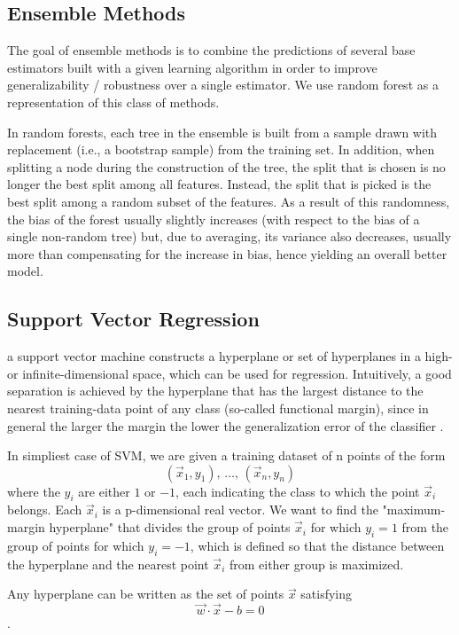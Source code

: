 \subsection{Ensemble Methods}

The goal of ensemble methods is to combine the predictions of several base estimators built with a given learning algorithm in order to improve generalizability / robustness over a single estimator. We use random forest as a representation of this class of methods.

In random forests, each tree in the ensemble is built from a sample drawn with replacement (i.e., a bootstrap sample) from the training set. In addition, when splitting a node during the construction of the tree, the split that is chosen is no longer the best split among all features. Instead, the split that is picked is the best split among a random subset of the features. As a result of this randomness, the bias of the forest usually slightly increases (with respect to the bias of a single non-random tree) but, due to averaging, its variance also decreases, usually more than compensating for the increase in bias, hence yielding an overall better model. \cite{breiman2001random}

\subsection{Support Vector Regression}

a support vector machine constructs a hyperplane or set of hyperplanes in a high- or infinite-dimensional space, which can be used for regression. Intuitively, a good separation is achieved by the hyperplane that has the largest distance to the nearest training-data point of any class (so-called functional margin), since in general the larger the margin the lower the generalization error of the classifier \cite{suykens1999least}.

In simpliest case of SVM, we are given a training dataset of n points of the form
$$(\vec{x}_1, y_1),\, \ldots ,\, (\vec{x}_n, y_n)$$
where the $y_i$ are either $1$ or $−1$, each indicating the class to which the point $\vec{x}_i$  belongs. Each  $\vec{x}_i$  is a p-dimensional real vector. We want to find the "maximum-margin hyperplane" that divides the group of points $\vec{x}_i$ for which $y_i=1$ from the group of points for which $y_i=-1$, which is defined so that the distance between the hyperplane and the nearest point $\vec{x}_i$ from either group is maximized.

Any hyperplane can be written as the set of points $\vec{x}$ satisfying
$$\vec{w}\cdot\vec{x} - b=0$$.

